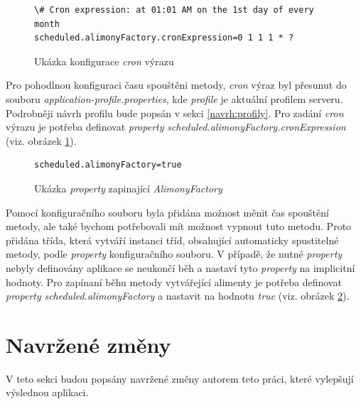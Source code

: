             \begin{figure}
                \begin{verbatim}
\# Cron expression: at 01:01 AM on the 1st day of every month
scheduled.alimonyFactory.cronExpression=0 1 1 1 * ?
                \end{verbatim}
                \caption{Ukázka konfigurace \textit{cron} výrazu} 
                \label{code:cron-expression}
            \end{figure}
            Pro pohodlnou konfiguraci času spouštěni metody, \textit{cron} výraz byl přesunut do souboru \textit{application-{profile}.properties}, kde \textit{profile} je aktuální profilem serveru. Podrobněji návrh profilu bude popsán v sekci \ref{navrh:profily}. Pro zadání \textit{cron} výrazu je potřeba definovat \textit{property} \textit{scheduled.alimonyFactory.cronExpression} (viz. obrázek \ref{code:cron-expression}).
            
            \begin{figure}
                \begin{verbatim}
scheduled.alimonyFactory=true
                \end{verbatim}
                \caption{Ukázka \textit{property} zapinající \textit{AlimonyFactory}} 
                \label{code:alimony-factory-true}
            \end{figure}
            Pomocí konfiguračního souboru byla přidána možnost měnit čas spouštění metody, ale také bychom potřebovali mít možnost vypnout tuto metodu. Proto přidána třída, která vytváří instanci tříd, obsahující automaticky spustitelné metody, podle \textit{property} konfiguračního souboru. V případě, že nutné \textit{property} nebyly definovány aplikace se neukončí běh a nastaví tyto \textit{property} na implicitní hodnoty. Pro zapínaní běhu metody vytvářející alimenty je potřeba definovat \textit{property} \textit{scheduled.alimonyFactory} a nastavit na hodnotu \textit{true} (viz. obrázek \ref{code:alimony-factory-true}).
            
\section{Navržené změny}
    V teto sekci budou popsány navržené změny autorem teto práci, které vylepšují výslednou aplikaci.
    

